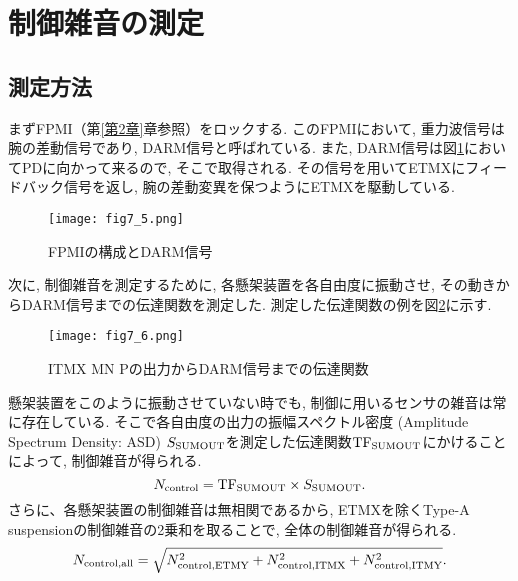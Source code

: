 \section{制御雑音の測定}
\subsection{測定方法}
まずFPMI（第\ref{第2章}章参照）をロックする. このFPMIにおいて, 重力波信号は腕の差動信号であり, DARM信号と呼ばれている. また, DARM信号は図\ref{fig7.5}においてPDに向かって来るので, そこで取得される. その信号を用いてETMXにフィードバック信号を返し, 腕の差動変異を保つようにETMXを駆動している.
\begin{figure}[H]
\begin{center}
\texttt{[image: fig7\_5.png]}
\caption[FPMIの構成とDARM信号]{FPMIの構成とDARM信号}
\label{fig7.5}
\end{center}
\end{figure}
次に, 制御雑音を測定するために, 各懸架装置を各自由度に振動させ, その動きからDARM信号までの伝達関数を測定した. 測定した伝達関数の例を図\ref{fig7.6}に示す. 
\begin{figure}[H]
\begin{center}
\texttt{[image: fig7\_6.png]}
\caption[ITMX MN Pの出力からDARM信号までの伝達関数]{ITMX MN Pの出力からDARM信号までの伝達関数}
\label{fig7.6}
\end{center}
\end{figure}
懸架装置をこのように振動させていない時でも, 制御に用いるセンサの雑音は常に存在している. そこで各自由度の出力の振幅スペクトル密度 (Amplitude Spectrum Density: ASD)  $S_{\rm SUMOUT}$を測定した伝達関数${\rm TF}_{\rm SUMOUT}$にかけることによって, 制御雑音が得られる. 
\begin{equation}
N_{\rm control}={\rm TF}_{\rm SUMOUT}\times S_{\rm SUMOUT}.
\end{equation}
さらに、各懸架装置の制御雑音は無相関であるから, ETMXを除くType-A suspensionの制御雑音の2乗和を取ることで, 全体の制御雑音が得られる. 
\begin{equation}
N_{\rm control, all}=\sqrt{N_{\rm control, ETMY}^2+N_{\rm control, ITMX}^2+N_{\rm control, ITMY}^2}.
\label{eq7.10}
\end{equation}
